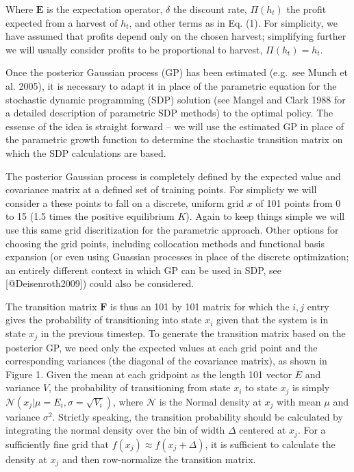 \documentclass[author-year, review]{elsarticle} %
\begin{document}
Where $\mathbf{E}$ is the expectation operator, $\delta$ the discount
rate, $\Pi(h_t)$ the profit expected from a harvest of $h_t$, and other
terms as in Eq. (1). For simplicity, we have assumed that profits depend
only on the chosen harvest; simplifying further we will usually consider
profits to be proportional to harvest, $\Pi(h_t) = h_t$.

Once the posterior Gaussian process (GP) has been estimated (e.g.~see
Munch et al. 2005), it is necessary to adapt it in place of the
parametric equation for the stochastic dynamic programming (SDP)
solution (see Mangel and Clark 1988 for a detailed description of
parametric SDP methods) to the optimal policy. The essense of the idea
is straight forward -- we will use the estimated GP in place of the
parametric growth function to determine the stochastic transition matrix
on which the SDP calculations are based.

The posterior Gaussian process is completely defined by the expected
value and covariance matrix at a defined set of training points. For
simplicty we will consider a these points to fall on a discrete, uniform
grid $x$ of 101 points from 0 to 15 (1.5 times the positive equilibrium
$K$). Again to keep things simple we will use this same grid
discritization for the parametric approach. Other options for choosing
the grid points, including collocation methods and functional basis
expansion (or even using Guassian processes in place of the discrete
optimization; an entirely different context in which GP can be used in
SDP, see {[}@Deisenroth2009{]}) could also be considered.

The transition matrix $\mathbf{F}$ is thus an 101 by 101 matrix for
which the ${i,j}$ entry gives the probability of transitioning into
state $x_i$ given that the system is in state $x_j$ in the previous
timestep. To generate the transition matrix based on the posterior GP,
we need only the expected values at each grid point and the
corresponding variances (the diagonal of the covariance matrix), as
shown in Figure 1. Given the mean at each gridpoint as the length 101
vector $E$ and variance $V$, the probability of transitioning from state
$x_i$ to state $x_j$ is simply
$\mathcal{N}\left(x_j \vert  \mu = E_i, \sigma = \sqrt{V_i}\right)$,
where $\mathcal{N}$ is the Normal density at $x_j$ with mean $\mu$ and
variance $\sigma^2$. Strictly speaking, the transition probability
should be calculated by integrating the normal density over the bin of
width $\Delta$ centered at $x_j$. For a sufficiently fine grid that
$f(x_j) \approx f(x_j + \Delta)$, it is sufficient to calculate the
density at $x_j$ and then row-normalize the transition matrix.
\end{document}
